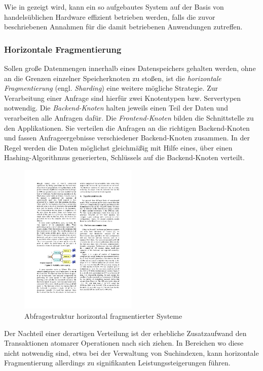 Wie in  \citep{ghemawat03}  gezeigt wird, kann ein so aufgebautes System auf der Basis von handelsüblichen Hardware effizient betrieben werden, falls die zuvor beschriebenen Annahmen für die damit betriebenen Anwendungen zutreffen.  \citep{ghemawat03}

\subsubsection{Horizontale Fragmentierung}\label{sec:sharding}

Sollen große Datenmengen innerhalb eines Datenspeichers gehalten werden, ohne an die Grenzen einzelner Speicherknoten zu stoßen, ist die \textit{horizontale Fragmentierung} (engl. \textit{Sharding}) eine weitere mögliche Strategie. Zur Verarbeitung einer Anfrage sind hierfür zwei Knotentypen bzw. Servertypen notwendig. Die \textit{Backend-Knoten} halten jeweils einen Teil der Daten und verarbeiten alle Anfragen dafür. Die \textit{Frontend-Knoten} bilden die Schnittstelle zu den Applikationen. Sie verteilen die Anfragen an die richtigen Backend-Knoten und fassen Anfrageergebnisse verschiedener Backend-Knoten zusammen. In der Regel werden die Daten möglichst gleichmäßig mit Hilfe eines, über einen Hashing-Algorithmus generierten, Schlüssels auf die Backend-Knoten verteilt. \citep{Michael07}
\begin{figure}[H]
  \centering
    \includegraphics[width=0.5\textwidth]{Abbildungen/sharding}
    \caption[Horizonale Fragmentierung]{\footnotesize Abfragestruktur horizontal fragmentierter Systeme {\footnotemark} }
    \label{fig:sharding}
\end{figure}

Der Nachteil einer derartigen Verteilung ist der erhebliche Zusatzaufwand den Transaktionen atomarer Operationen nach sich ziehen. In Bereichen wo diese nicht notwendig sind, etwa bei der Verwaltung von Suchindexen, kann horizontale Fragmentierung allerdings zu signifikanten Leistungssteigerungen führen. \citep{Michael07}

